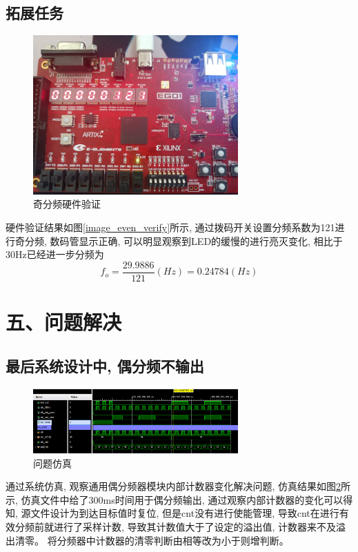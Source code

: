 \documentclass{article}
\newcommand{\fourhao}{\fontsize{14pt}{\baselineskip}\selectfont} %
\newcommand{\xiaosihao}{\fontsize{12pt}{\baselineskip}\selectfont} %
\begin{document}
\subsection*{拓展任务}
\begin{figure}[htbp]
    \centering
    \includegraphics[width=0.7\textwidth]{image/2024-06-18-18-43-30.png}
    \caption{奇分频硬件验证}
    \label{image_odd_verify}
\end{figure}
硬件验证结果如图\ref{image_even_verify}所示, 通过拨码开关设置分频系数为121进行奇分频, 数码管显示正确, 可以明显观察到LED的缓慢的进行亮灭变化, 相比于30Hz已经进一步分频为
$$f_o = \frac{29.9886}{121}(Hz) = 0.24784 (Hz)$$
\section*{\fourhao 五、问题解决}
\xiaosihao
{}
\subsection*{最后系统设计中, 偶分频不输出}
\begin{figure}[H]
    \centering
    \includegraphics[width=0.7\textwidth]{image/2024-06-18-16-29-13.png}
    \caption{问题仿真}
    \label{image_QA_1}
\end{figure}
通过系统仿真, 观察通用偶分频器模块内部计数器变化解决问题, 仿真结果如图\ref{image_QA_1}所示, 仿真文件中给了300ms时间用于偶分频输出, 通过观察内部计数器的变化可以得知, 源文件设计为到达目标值时复位, 但是cnt没有进行使能管理, 导致cnt在进行有效分频前就进行了采样计数, 导致其计数值大于了设定的溢出值, 计数器来不及溢出清零。
将分频器中计数器的清零判断由相等改为小于则增判断。
\end{document}
